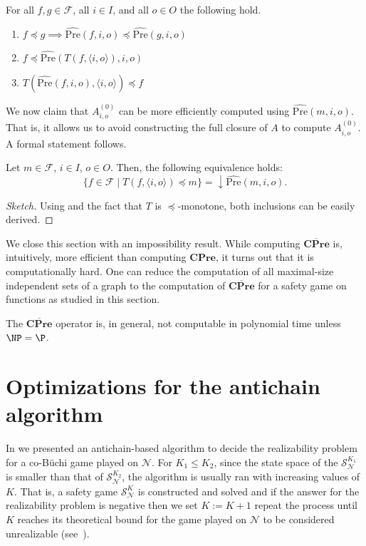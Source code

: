 \documentclass[runningheads,a4paper,draft]{llncs}
\newcommand{\cpre}{\mathbf{CPre}}
\newcommand{\calF}{\mathcal{F}}
\newcommand{\calN}{\mathcal{N}}
\newcommand{\calS}{\mathcal{S}}
\newcommand{\closedn}[1]{\mathrm{\downarrow} #1}
\newcommand{\pseudopre}{\widehat{\mathrm{Pre}}}
\begin{document}
\begin{lemma}\label{lem:order-pseudopre}
  For all $f,g \in \calF$, all $i \in I$, and all $o \in O$
  the following hold.
  \begin{enumerate}
    \item $f \preceq g \implies \pseudopre(f,i,o) \preceq \pseudopre(g,i,o)$
      \label{itm:order-pre}
    \item $f \preceq \pseudopre(T(f,\langle i, o \rangle),i,o)$
      \label{itm:order-postpre}
    \item $T(\pseudopre(f,i,o), \langle i, o \rangle) \preceq f$
      \label{itm:order-prepost}
  \end{enumerate}
\end{lemma}

We now claim that $A^{(0)}_{i,o}$ can be more efficiently computed using
$\pseudopre(m,i,o)$. That is, it allows us to avoid constructing the full
closure of $A$ to compute $A^{(0)}_{i,o}$. A formal statement follows.

\begin{proposition}
  Let $m \in \calF$, $i \in I$, $o \in O$. Then, the following equivalence
  holds:
  \[
    \{ f \in \calF \mid T(f, \langle i,
    o \rangle) \preceq m\} = \closedn{\pseudopre(m,i,o)}.
  \]
\end{proposition}
\begin{proof}[Sketch]
  Using  and the fact that $T$ is $\preceq$-monotone,
  both inclusions can be easily derived.
\end{proof}

We close this section with an impossibility result. While computing
$\overline{\cpre}$ is, intuitively, more efficient than computing $\cpre$, it
turns out that it is computationally hard. One can reduce the computation of
all maximal-size independent sets of a graph to the computation of
$\overline{\cpre}$ for a safety game on functions as studied in this section.
\begin{proposition}
  The $\overline{\cpre}$ operator is, in general, not computable in
  polynomial time unless $\NP = \P$.
\end{proposition}

\section{Optimizations for the antichain algorithm}
In  we presented an antichain-based algorithm to
decide the realizability problem for a co-B\"uchi game played on $\calN$.  For
$K_1 \leq K_2$, since the state space of the $\calS^{K_1}_\calN$ is smaller
than that of $\calS^{K_2}_\calN$, the algorithm is usually ran with increasing
values of $K$. That is, a safety game $\calS^{K}_\calN$ is constructed and
solved and if the answer for the realizability problem is negative then we set
$K := K + 1$ repeat the process until $K$ reaches its theoretical bound for
the game played on $\calN$ to be considered unrealizable (see~).
\end{document}
